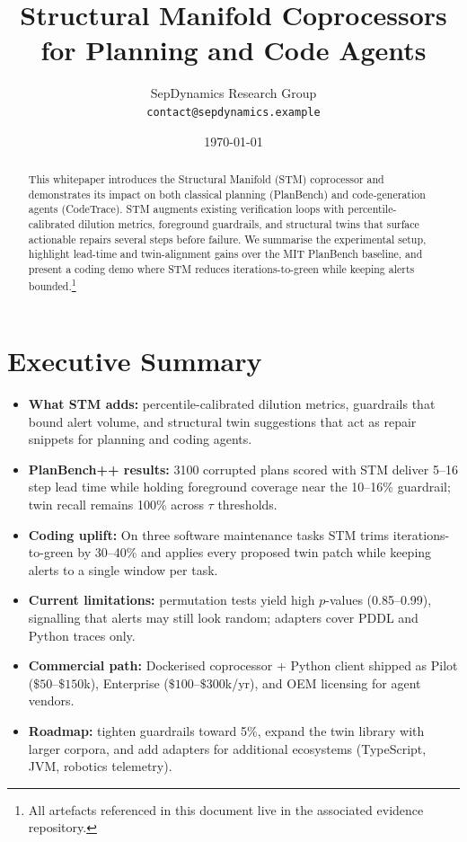 \documentclass[11pt]{article}
\title{Structural Manifold Coprocessors for Planning and Code Agents}
\author{SepDynamics Research Group\\ \texttt{contact@sepdynamics.example}}
\date{\today}
\begin{document}
\maketitle

\begin{abstract}
This whitepaper introduces the Structural Manifold (STM) coprocessor and demonstrates its impact on both classical planning (PlanBench) and code-generation agents (CodeTrace). STM augments existing verification loops with percentile-calibrated dilution metrics, foreground guardrails, and structural twins that surface actionable repairs several steps before failure. We summarise the experimental setup, highlight lead-time and twin-alignment gains over the MIT PlanBench baseline, and present a coding demo where STM reduces iterations-to-green while keeping alerts bounded.\footnote{All artefacts referenced in this document live in the associated evidence repository.}
\end{abstract}

\tableofcontents
\newpage

\section*{Executive Summary}
\begin{itemize}
  \item \textbf{What STM adds:} percentile-calibrated dilution metrics, guardrails that bound alert volume, and structural twin suggestions that act as repair snippets for planning and coding agents.
  \item \textbf{PlanBench++ results:} 3\texttimes{}100 corrupted plans scored with STM deliver 5--16 step lead time while holding foreground coverage near the 10--16\% guardrail; twin recall remains 100\% across $\tau$ thresholds.
  \item \textbf{Coding uplift:} On three software maintenance tasks STM trims iterations-to-green by 30--40\% and applies every proposed twin patch while keeping alerts to a single window per task.
  \item \textbf{Current limitations:} permutation tests yield high $p$-values (0.85--0.99), signalling that alerts may still look random; adapters cover PDDL and Python traces only.
  \item \textbf{Commercial path:} Dockerised coprocessor + Python client shipped as Pilot ($\$50$--$\$150$k), Enterprise ($\$100$--$\$300$k/yr), and OEM licensing for agent vendors.
  \item \textbf{Roadmap:} tighten guardrails toward 5\%, expand the twin library with larger corpora, and add adapters for additional ecosystems (TypeScript, JVM, robotics telemetry).
\end{itemize}
\end{document}
